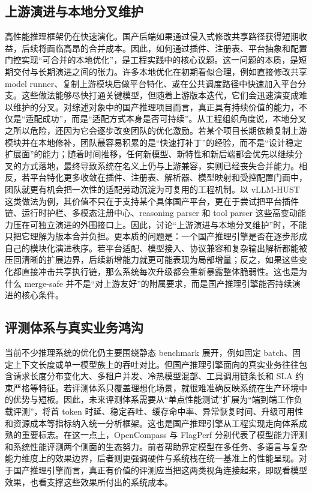 \subsection{上游演进与本地分叉维护}

高性能推理框架仍在快速演化。国产后端如果通过侵入式修改共享路径获得短期收益，后续将面临高昂的合并成本。因此，如何通过插件、注册表、平台抽象和配置门控实现“可合并的本地优化”，是工程实践中的核心议题。这一问题的本质，是短期交付与长期演进之间的张力。许多本地优化在初期看似合理，例如直接修改共享 model runner、复制上游模块后做平台特化、或在公共调度路径中快速加入平台分支。这些做法能够尽快打通关键模型，但随着上游版本迭代，它们会迅速演变成难以维护的分叉。对综述对象中的国产推理项目而言，真正具有持续价值的能力，不仅是“适配成功”，而是“适配方式本身是否可持续”。从工程组织角度说，本地分叉之所以危险，还因为它会逐步改变团队的优化激励。若某个项目长期依赖复制上游模块并在本地修补，团队最容易积累的是“快速打补丁”的经验，而不是“设计稳定扩展面”的能力；随着时间推移，任何新模型、新特性和新后端都会优先以继续分叉的方式落地，最终导致系统在名义上仍与上游兼容，实则已经丧失合并能力。相反，若平台特化更多收敛在插件、注册表、解析器、模型映射和受控配置门面中，团队就更有机会把一次性的适配劳动沉淀为可复用的工程机制。以 vLLM-HUST 这类做法为例，其价值不只在于支持某个具体国产平台，更在于尝试把平台插件链、运行时护栏、多模态注册中心、reasoning parser 和 tool parser 这些高变动能力压在可独立演进的外围接口上\citep{vllmhust}。因此，讨论“上游演进与本地分叉维护”时，不能只把它理解为版本合并负担。更本质的问题是：一个国产推理引擎是否在逐步形成自己的模块化演进秩序。若平台适配、模型接入、协议兼容和复杂输出解析都能被压回清晰的扩展边界，后续新增能力就更可能表现为局部增量；反之，如果这些变化都直接冲击共享执行链，那么系统每次升级都会重新暴露整体脆弱性。这也是为什么 merge-safe 并不是“对上游友好”的附属要求，而是国产推理引擎能否持续演进的核心条件。

\subsection{评测体系与真实业务鸿沟}

当前不少推理系统的优化仍主要围绕静态 benchmark 展开，例如固定 batch、固定上下文长度或单一模型族上的吞吐对比。但国产推理引擎面向的真实业务往往包含请求长度分布变化大、多租户并发、冷热模型混部、工具调用链条长和 SLA 约束严格等特征。若评测体系只覆盖理想化场景，就很难准确反映系统在生产环境中的优势与短板。因此，未来评测体系需要从“单点性能测试”扩展为“端到端工作负载评测”，将首 token 时延、稳定吞吐、缓存命中率、异常恢复时间、升级可用性和资源成本等指标纳入统一分析框架。这也是国产推理引擎从工程实现走向体系成熟的重要标志。在这一点上，OpenCompass 与 FlagPerf 分别代表了模型能力评测和系统性能评测两个侧面的生态努力\citep{opencompass,flagperf}。前者帮助界定模型在多任务、多语言与复杂能力维度上的效果边界，后者则更强调硬件与系统栈在统一基准上的性能呈现。对于国产推理引擎而言，真正有价值的评测应当把这两类视角连接起来，即既看模型效果，也看支撑这些效果所付出的系统成本。


